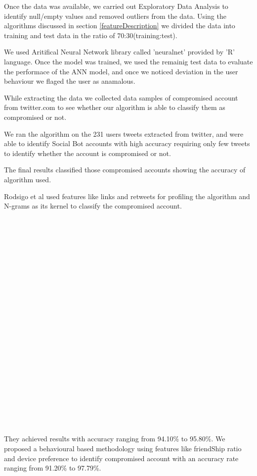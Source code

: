 \documentclass[conference]{IEEEtran}
\begin{document}
	  Once the data was available, we carried out Exploratory Data Analysis to identify null/empty values and removed outliers from the data. 
	  Using the algorithms discussed in section \ref{featureDescription} we divided the data into training and test data in the ratio of 70:30(training:test).

	  We used Aritifical Neural Network library called 'neuralnet' provided by 'R' language. 
	  Once the model was trained, we used the remainig test data to evaluate the performace of the ANN model, 
	  and once we noticed deviation in the user behaviour we flaged the user as anamalous.
	
	  While extracting the data we collected data samples of compromised account from twitter.com to see 
	  whether our algorithm is able to classify them as compromised or not. 
	  
	  We ran the algorithm on the 231 users tweets extracted from twitter, and were able to identify Social Bot accounts 
	  with high accuracy requiring only few tweets to identify whether the account is compromised or not.
	 
	  The final results classified those compromised accounts showing the accuracy of algorithm used.
	  
	  Rodsigo et al\cite{12} used features like links and retweets for profiling the algorithm and N-grams as its kernel to classify the compromised account.\\\\\\\\\\\\\\\\\\\\\\\\\\\\\\\\\\\\\\\\\\\\\\\\
	   They achieved results with accuracy ranging  from 94.10\% to 95.80\%. We proposed a behavioural based methodology using features like friendShip ratio 
	   and device preference to identify compromised account with an accuracy rate ranging from 91.20\% to 97.79\%.
 
\end{document}
